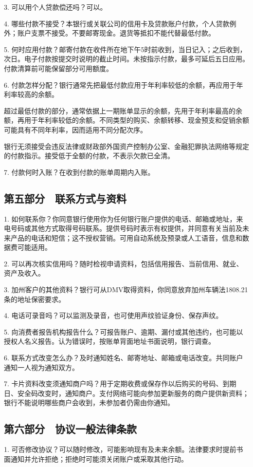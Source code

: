 \documentclass[UTF8,fontset=none,11pt,a4paper]{ctexart}
\begin{document}
3. 可以用个人贷款偿还吗？可以。


4. 哪些付款不接受？本银行或关联公司的信用卡及贷款账户付款，个人贷款例外；账户支票不接受。不要邮寄现金。退货等抵扣不能代替最低付款。


5. 何时应用付款？邮寄付款在收件所在地下午5时前收到，当日记入；之后收到，次日。电子付款按提交时说明的截止时间。未按指示付款，最多可延后五日应用。付款清算前可能保留部分可用额度。


6. 付款怎样分配？银行通常先把最低付款应用于年利率较低的余额，再应用于年利率较高的余额。


超过最低付款的部分，通常依据上一期账单显示的余额，先用于年利率最高的余额，再用于年利率较低的余额。不同类型的购买、余额转移、现金预支和促销余额可能具有不同年利率，因而适用不同分配次序。


银行无须接受会违反法律或财政部外国资产控制办公室、金融犯罪执法网络等规定的付款指示。接受低于全额的付款，不表示欠款已全清。


7. 付款何时入账？在收到付款的账单周期内入账。


\subsection*{第五部分　联系方式与资料}
1. 如何联系你？你同意银行使用你为任何银行账户提供的电话、邮箱或地址，来电号码或其他方式取得号码联系。提供号码时表示有权提供，并同意有关当前及未来产品的电话和短信；这不授权营销。可用自动系统及预录或人工语音，信息和数据费可能适用。


2. 可以再次核实信用吗？随时检视申请资料，包括信用报告、当前信用、就业、资产及收入。


3. 加州客户的其他资料？银行可从DMV取得资料，你同意放弃加州车辆法1808.21条的地址保密要求。


4. 电话可录音吗？可以监测及录音，也可使用声纹验证身份、保存声纹。


5. 向消费者报告机构报告什么？可报告账户、逾期、漏付或其他违约，也可能以授权人名义报告。认为错误时，按账单背面地址书面说明，银行调查。


6. 联系方式改变怎么办？及时通知姓名、邮寄地址、邮箱或电话改变。共同账户通知一人视为通知双方。


7. 卡片资料改变须通知商户吗？用于定期收费或保存作以后购买的号码、到期日、安全码改变时，通知商户。支付网络可能向参加更新服务的商户提供新资料；银行不能说明哪些商户会收到，未参加者仍需由你通知。


\subsection*{第六部分　协议一般法律条款}
1. 可否修改协议？可以随时修改，可能影响现有及未来余额。法律要求时提前书面通知并允许拒绝；拒绝时可能须关闭账户或采取其他行动。
\end{document}
